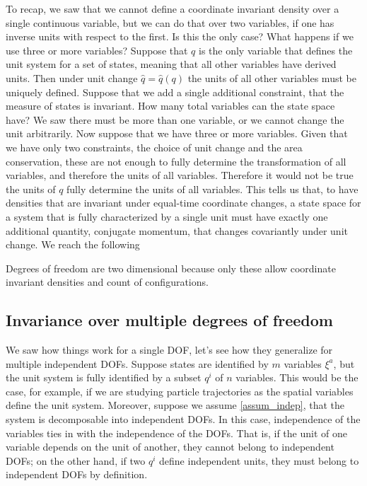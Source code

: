 To recap, we saw that we cannot define a coordinate invariant density over a single continuous variable, but we can do that over two variables, if one has inverse units with respect to the first. Is this the only case? What happens if we use three or more variables? Suppose that $q$ is the only variable that defines the unit system for a set of states, meaning that all other variables have derived units. Then under unit change $\hat{q} = \hat{q}(q)$ the units of all other variables must be uniquely defined. Suppose that we add a single additional constraint, that the measure of states is invariant. How many total variables can the state space have? We saw there must be more than one variable, or we cannot change the unit arbitrarily. Now suppose that we have three or more variables. Given that we have only two constraints, the choice of unit change and the area conservation, these are not enough to fully determine the transformation of all variables, and therefore the units of all variables. Therefore it would not be true the units of $q$ fully determine the units of all variables. This tells us that, to have densities that are invariant under equal-time coordinate changes, a state space for a system that is fully characterized by a single unit must have exactly one additional quantity, conjugate momentum, that changes covariantly under unit change. We reach the following
\begin{insight}
	Degrees of freedom are two dimensional because only these allow coordinate invariant densities and count of configurations.
\end{insight}


\subsection{Invariance over multiple degrees of freedom}


We saw how things work for a single DOF, let's see how they generalize for multiple independent DOFs. Suppose states are identified by $m$ variables $\xi^a$, but the unit system is fully identified by a subset $q^i$ of $n$ variables. This would be the case, for example, if we are studying particle trajectories as the spatial variables define the unit system. Moreover, suppose we assume \ref{assum_indep}, that the system is decomposable into independent DOFs. In this case, independence of the variables ties in with the independence of the DOFs. That is, if the unit of one variable depends on the unit of another, they cannot belong to independent DOFs; on the other hand, if two $q^i$ define independent units, they must belong to independent DOFs by definition.

